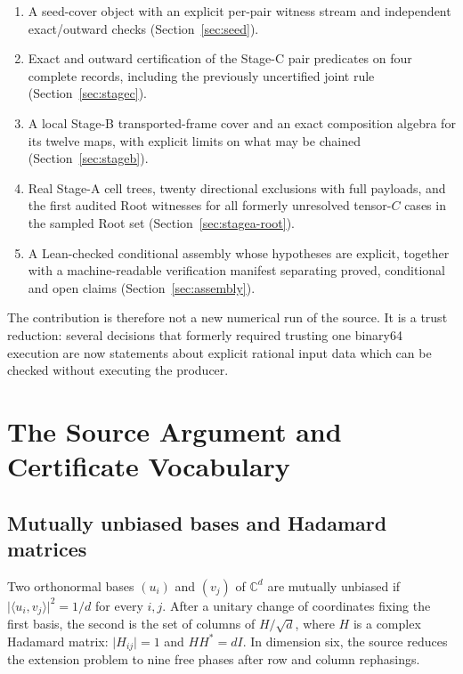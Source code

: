 \documentclass[10pt]{article}
\theoremstyle{definition}
\newcommand{\C}{\mathbb C}
\newcommand{\abs}[1]{\lvert #1\rvert}
\newcommand{\inner}[2]{\langle #1,#2\rangle}
\begin{document}
\begin{enumerate}[label=\textbf{C\arabic*.},leftmargin=2.2em]
\item A seed-cover object with an explicit per-pair witness stream and independent exact/outward checks (Section~\ref{sec:seed}).
\item Exact and outward certification of the Stage-C pair predicates on four complete records, including the previously uncertified joint rule (Section~\ref{sec:stagec}).
\item A local Stage-B transported-frame cover and an exact composition algebra for its twelve maps, with explicit limits on what may be chained (Section~\ref{sec:stageb}).
\item Real Stage-A cell trees, twenty directional exclusions with full payloads, and the first audited Root witnesses for all formerly unresolved tensor-$C$ cases in the sampled Root set (Section~\ref{sec:stagea-root}).
\item A Lean-checked conditional assembly whose hypotheses are explicit, together with a machine-readable verification manifest separating proved, conditional and open claims (Section~\ref{sec:assembly}).
\end{enumerate}

The contribution is therefore not a new numerical run of the source. It is a trust reduction: several decisions that formerly required trusting one binary64 execution are now statements about explicit rational input data which can be checked without executing the producer.

\section{The Source Argument and Certificate Vocabulary}
\label{sec:source}

\subsection{Mutually unbiased bases and Hadamard matrices}

Two orthonormal bases $(u_i)$ and $(v_j)$ of $\C^d$ are mutually unbiased if $\abs{\inner{u_i}{v_j}}^2=1/d$ for every $i,j$. After a unitary change of coordinates fixing the first basis, the second is the set of columns of $H/\sqrt d$, where $H$ is a complex Hadamard matrix: $\abs{H_{ij}}=1$ and $HH^*=dI$. In dimension six, the source reduces the extension problem to nine free phases after row and column rephasings.
\end{document}

